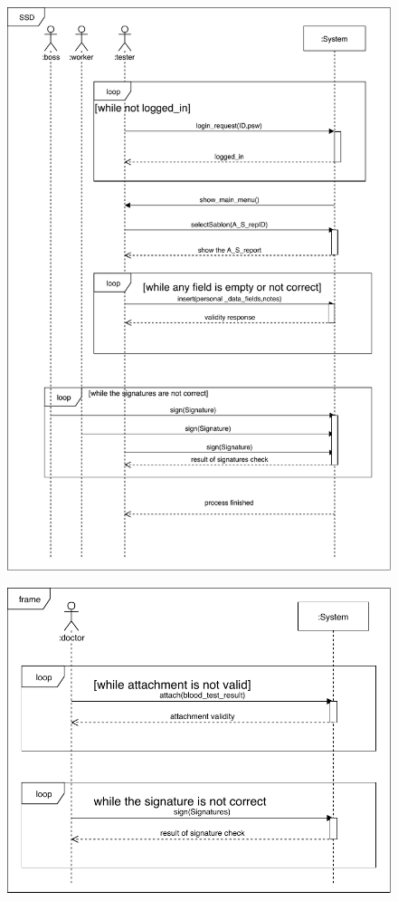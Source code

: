 \begin{figure}[!h]
	\centering
	\includegraphics[width=120mm, keepaspectratio]{figures/ssd.pdf}
\end{figure}

\begin{figure}[!h]
\centering
\includegraphics[width=120mm, keepaspectratio]{figures/ssd2.pdf}
\end{figure}
